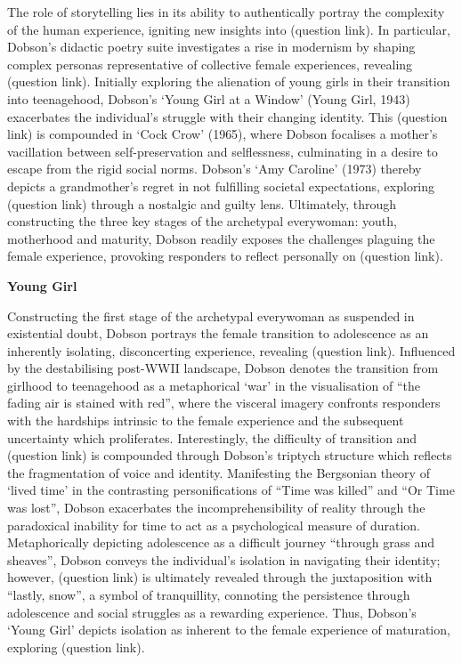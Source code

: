 	The role of storytelling lies in its ability to authentically portray the complexity of the human experience, igniting new insights into (question link). In particular, Dobson’s didactic poetry suite investigates a rise in modernism by shaping complex personas representative of collective female experiences, revealing (question link). Initially exploring the alienation of young girls in their transition into teenagehood, Dobson’s ‘Young Girl at a Window’ (Young Girl, 1943) exacerbates the individual’s struggle with their changing identity. This (question link) is compounded in ‘Cock Crow’ (1965), where Dobson focalises a mother’s vacillation between self-preservation and selflessness, culminating in a desire to escape from the rigid social norms. Dobson’s ‘Amy Caroline’ (1973) thereby depicts a grandmother’s regret in not fulfilling societal expectations, exploring (question link) through a nostalgic and guilty lens. Ultimately, through constructing the three key stages of the archetypal everywoman: youth, motherhood and maturity, Dobson readily exposes the challenges plaguing the female experience, provoking responders to reflect personally on (question link).

	\textbf{Young Girl}

	Constructing the first stage of the archetypal everywoman as suspended in existential doubt, Dobson portrays the female transition to adolescence as an inherently isolating, disconcerting experience, revealing (question link). Influenced by the destabilising post-WWII landscape, Dobson denotes the transition from girlhood to teenagehood as a metaphorical ‘war’ in the visualisation of  “the fading air is stained with red”, where the visceral imagery confronts responders with the hardships intrinsic to the female experience and the subsequent uncertainty which proliferates. Interestingly, the difficulty of transition and (question link) is compounded through Dobson's triptych structure which reflects the fragmentation of voice and identity. Manifesting the Bergsonian theory of ‘lived time’ in the contrasting personifications of “Time was killed” and “Or Time was lost”, Dobson exacerbates the incomprehensibility of reality through the paradoxical inability for time to act as a psychological measure of duration. Metaphorically depicting adolescence as a difficult journey “through grass and sheaves”, Dobson conveys the individual’s isolation in navigating their identity; however, (question link) is ultimately revealed through the juxtaposition with “lastly, snow”, a symbol of tranquillity, connoting the persistence through adolescence and social struggles as a rewarding experience. Thus, Dobson’s ‘Young Girl’ depicts isolation as inherent to the female experience of maturation, exploring (question link).


